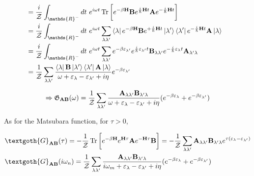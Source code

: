 \begin{equation*}
\begin{array}{c}
\begin{array}{ccc}
\begin{split}
        \\
        &= \frac{i}{\mathcal{Z}} \int_{\mathds{R}^-} dt \blanky e^{i\omega t} \Tr \bigg[e^{-\beta {\bf H}} 
        {\bf B}  e^{\frac{i}{\hbar} {\bf H} t}{\bf A} e^{-\frac{i}{\hbar} {\bf H} t}\bigg] \\
        &= \frac{i}{\mathcal{Z}} \int_{\mathds{R}^-} dt \blanky e^{i\omega t} \sum_{\lambda \lambda'} \bra{\lambda} e^{-\beta {\bf H}} {\bf B} 
        e^{+\frac{i}{\hbar} {\bf H} t}\ket{\lambda'} \bra{\lambda'} e^{-\frac{i}{\hbar} {\bf H} t} {\bf A}  \ket{\lambda} \\
        &= \frac{i}{\mathcal{Z}} \int_{\mathds{R}^-} dt \blanky e^{i\omega t} \sum_{\lambda \lambda'} e^{-\beta \varepsilon_{\lambda'}} e^{\frac{i}{\hbar} \varepsilon_{\lambda'} t} {\bf B}_{\lambda \lambda'} e^{-\frac{i}{\hbar} \varepsilon_{\lambda} t} {\bf A}_{\lambda' \lambda}\\
        &= \frac{1}{\mathcal{Z}} \sum_{\lambda \lambda'} \frac{
        \bra{\lambda} {\bf B} \ket{\lambda'} \bra{\lambda'} {\bf A} \ket{\lambda}}{\omega + \varepsilon_{\lambda} - \varepsilon_{\lambda'} + i\eta} e^{-\beta \varepsilon_{\lambda'}}\\
        \end{split}
    \end{array}
\end{array}
\end{equation*}

\normalsize
\begin{equation}
    \Rightarrow \mathfrak{G}_{{\bf AB}}(\omega) = \frac{1}{\mathcal{Z}} \sum_{\lambda \lambda'} \frac{
        {\bf A}_{\lambda \lambda'} {\bf B}_{\lambda' \lambda}}{\omega + \varepsilon_{\lambda} - \varepsilon_{\lambda'} + i\eta} ( e^{-\beta \varepsilon_{\lambda}} + e^{-\beta \varepsilon_{\lambda'}} )
\end{equation}

As for the Matsubara function, for $\tau > 0$,

\begin{equation}
    \begin{split}
        &\textgoth{G}_{{\bf AB}}(\tau) = - \frac{1}{\mathcal{Z}} \Tr \bigg[
        e^{-\beta {\bf H}} e^{{\bf H} \tau} {\bf A} e^{-{\bf H} \tau} {\bf B}
        \bigg] =  - \frac{1}{\mathcal{Z}} \sum_{\lambda \lambda'} {\bf A}_{\lambda \lambda'} {\bf B}_{\lambda' \lambda} e^{\tau (\varepsilon_{\lambda} - \varepsilon_{\lambda'})} \\
        & \textgoth{G}_{{\bf AB}}(i\omega_n) =  \frac{1}{\mathcal{Z}} \sum_{\lambda \lambda'} \frac{
        {\bf A}_{\lambda \lambda'} {\bf B}_{\lambda' \lambda}}{i\omega_m + \varepsilon_{\lambda} - \varepsilon_{\lambda'} + i\eta} ( e^{-\beta \varepsilon_{\lambda}} + e^{-\beta \varepsilon_{\lambda'}} )
        \end{split}
\end{equation}

